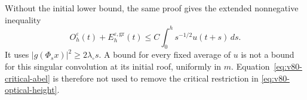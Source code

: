 Without the initial lower bound, the same proof gives the extended
nonnegative inequality
\begin{equation}\label{eq:v80-critical-abel}
 O_h^\varepsilon(t)+E_h^{\varepsilon,\mathrm{gr}}(t)
                 \le C\int_0^h s^{-1/2}u(t+s)\,ds.
\end{equation}
It uses $|g(\Phi_sx)|^2\ge2\lambda_\circ s$.
A bound for every fixed average of $u$ is not a bound for this
singular convolution at its initial roof, uniformly in $m$.
Equation~\eqref{eq:v80-critical-abel} is therefore not used to remove
the critical restriction in \eqref{eq:v80-optical-height}.
